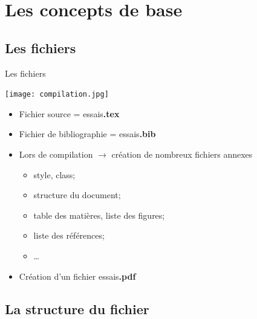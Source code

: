\section{Les concepts de base}
\subsection{Les fichiers}


\begin{frame}{Les fichiers}

    \begin{center}
        \texttt{[image: compilation.jpg]}
    \end{center}
    \begin{itemize}
        \item Fichier source = essais\alert{\textbf{.tex}}
        \item Fichier de bibliographie = essais\alert{\textbf{.bib}}
        \item Lors de compilation $\rightarrow$ création de nombreux fichiers annexes
        \begin{itemize}
            \item style, class;
            \item structure du document;
            \item table des matières, liste des figures;
            \item liste des références;
            \item \ldots{}
        \end{itemize}
        \item Création d'un fichier essais\alert{\textbf{.pdf}}
    \end{itemize}

\end{frame}


\subsection{La structure du fichier}

